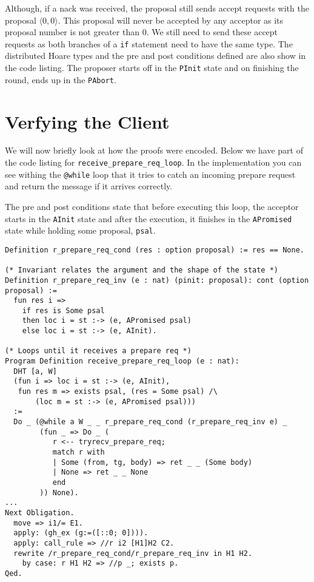 Although, if a nack was received, the proposal still sends
accept requests with the proposal $\langle 0, 0 \rangle$. This proposal will
never be accepted by any acceptor as its proposal number is not greater than 0.
We still need to send these accept requests as both branches of a \texttt{if}
statement need to have the same type. The distributed Hoare types and the pre and post conditions
defined are also show in the code listing. The proposer starts off in the \texttt{PInit}
state and on finishing the round, ends up in the \texttt{PAbort}.

\section{Verfying the Client}
We will now briefly look at how the proofs were encoded.
Below we have part of the code listing for \texttt{receive\_prepare\_req\_loop}.
In the implementation you can see withing the \texttt{@while} loop that it
tries to catch an incoming prepare request and return the message if it
arrives correctly.

The pre and post conditions state that before executing this loop, the acceptor
starts in the \texttt{AInit} state and after the execution, it finishes in
the \texttt{APromised} state while holding some proposal, \texttt{psal}.

\begin{lstlisting}
Definition r_prepare_req_cond (res : option proposal) := res == None.

(* Invariant relates the argument and the shape of the state *)
Definition r_prepare_req_inv (e : nat) (pinit: proposal): cont (option proposal) :=
  fun res i =>
    if res is Some psal
    then loc i = st :-> (e, APromised psal)
    else loc i = st :-> (e, AInit).

(* Loops until it receives a prepare req *)
Program Definition receive_prepare_req_loop (e : nat):
  DHT [a, W]
  (fun i => loc i = st :-> (e, AInit),
   fun res m => exists psal, (res = Some psal) /\
       (loc m = st :-> (e, APromised psal)))
  :=
  Do _ (@while a W _ _ r_prepare_req_cond (r_prepare_req_inv e) _
        (fun _ => Do _ (
           r <-- tryrecv_prepare_req;
           match r with
           | Some (from, tg, body) => ret _ _ (Some body)
           | None => ret _ _ None
           end
        )) None).
...
Next Obligation.
  move => i1/= E1.
  apply: (gh_ex (g:=([::0; 0]))).
  apply: call_rule => //r i2 [H1]H2 C2.
  rewrite /r_prepare_req_cond/r_prepare_req_inv in H1 H2.
    by case: r H1 H2 => //p _; exists p.
Qed.
\end{lstlisting}


